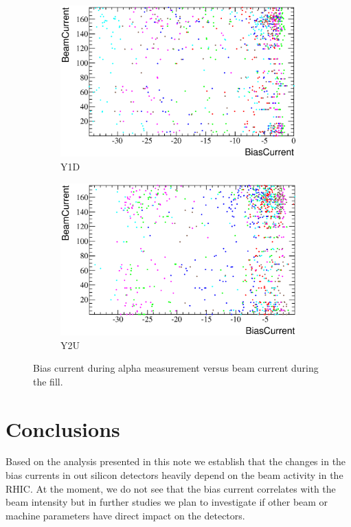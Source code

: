 \documentclass[a4paper,12pt]{article}
\begin{document}
\begin{figure}[p]
\begin{subfigure}[b]{0.5\textwidth}
\includegraphics[width=\textwidth]{gfx/run13_alpha_study/Y1D/c_hBiasCurrent_BeamCurrent.eps}
\caption{Y1D}
\end{subfigure}
\begin{subfigure}[b]{0.5\textwidth}
\includegraphics[width=\textwidth]{gfx/run13_alpha_study/Y2U/c_hBiasCurrent_BeamCurrent.eps}
\caption{Y2U}
\end{subfigure}
\caption{Bias current during alpha measurement versus beam current during the fill.}
\end{figure}


\section{Conclusions}

Based on the analysis presented in this note we establish that the changes in
the bias currents in out silicon detectors heavily depend on the beam activity
in the RHIC. At the moment, we do not see that the bias current correlates with
the beam intensity but in further studies we plan to investigate if other beam
or machine parameters have direct impact on the detectors.
\end{document}
